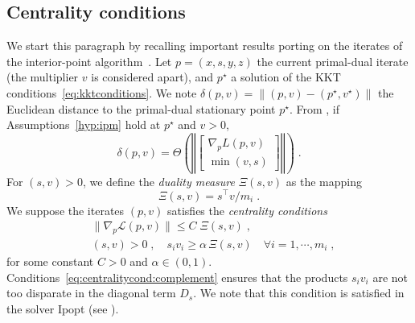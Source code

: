 \subsection{Centrality conditions}
We start this paragraph by recalling important results porting
on the iterates of the interior-point algorithm~\cite{wright2001effects}.
Let $p = (x, s, y, z)$ the current primal-dual iterate (the multiplier $v$ is considered apart),
and $p^\star$ a solution of the KKT conditions~\eqref{eq:kktconditions}.
We note $\delta(p, v) = \| (p, v) - (p^\star, v^\star) \|$ the Euclidean distance to the
primal-dual stationary point $p^\star$.
From \cite[Theorem 2.2]{wright2001effects}, if Assumptions~\ref{hyp:ipm}
hold at $p^\star$ and $v > 0$,
\begin{equation}
  \delta(p, v) = \Theta\left( \left\Vert \begin{bmatrix}
      \nabla_p L(p, v) \\ \min(v, s)
  \end{bmatrix}
  \right\Vert \right) \; .
\end{equation}
For $(s, v) > 0$, we define the \emph{duality measure} $\Xi(s, v)$ as the mapping
\begin{equation}
  \Xi(s, v) = s^\top v / m_i \; .
\end{equation}
We suppose the iterates $(p, v)$ satisfies the \emph{centrality conditions}
\begin{subequations}
  \label{eq:centralitycond}
  \begin{align}
    & \| \nabla_p \mathcal{L}(p, v) \| \leq C \; \Xi(s, v) \;,  \\
    \label{eq:centralitycond:complement}
    & (s, v) > 0 \;,\quad s_i v_i \geq \alpha \, \Xi(s, v) \quad \forall i =1, \cdots, m_i \; ,
  \end{align}
\end{subequations}
for some constant $C > 0$ and $\alpha \in (0, 1)$.
Conditions~\eqref{eq:centralitycond:complement} ensures that the products
$s_i v_i$ are not too disparate in the diagonal term $D_s$.
We note that this condition is satisfied in the solver Ipopt (see \cite[Equation (16)]{wachter2006implementation}).

